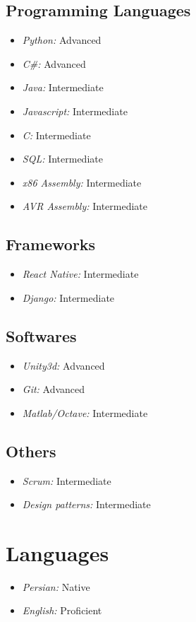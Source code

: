 \documentclass{article}
\begin{document}
\subsection{Programming Languages}
\begin{multicols}{2}
\begin{itemize}
        \item \emph{Python:} Advanced
        \item \emph{C\#:} Advanced
        \item \emph{Java:} Intermediate
        \item \emph{Javascript:} Intermediate
        \item \emph{C:} Intermediate
        \item \emph{SQL:} Intermediate
        \item \emph{x86 Assembly:} Intermediate
        \item \emph{AVR Assembly:} Intermediate
\end{itemize}
\end{multicols}

\subsection{Frameworks}
\begin{itemize}
        \item \emph{React Native:} Intermediate
        \item \emph{Django:} Intermediate
\end{itemize}

\subsection{Softwares}
\begin{itemize}
        \item \emph{Unity3d:} Advanced
        \item \emph{Git:} Advanced
        \item \emph{Matlab/Octave:} Intermediate
\end{itemize}

\subsection{Others}
\begin{itemize}
        \item \emph{Scrum:} Intermediate
        \item \emph{Design patterns:} Intermediate
\end{itemize}

\section{Languages}
\begin{itemize}
        \item \emph{Persian:} Native
        \item \emph{English:} Proficient
\end{itemize}
\end{document}

